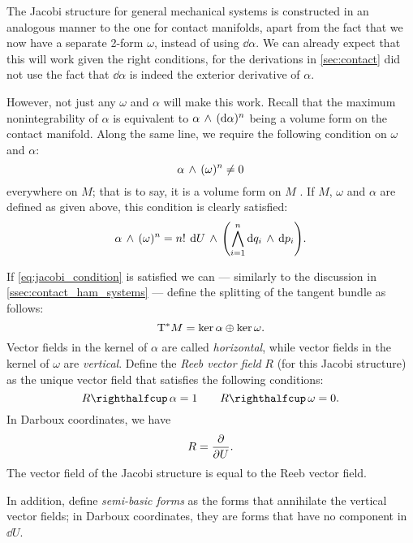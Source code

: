 The Jacobi structure for general mechanical systems is constructed in an analogous manner to the one for contact manifolds, apart from the fact that we now have a separate 2-form \(\omega\), instead of using \(\dd{\alpha}\). We can already expect that this will work given the right conditions, for the derivations in \cref{sec:contact} did not use the fact that \(\dd{\alpha}\) is indeed the exterior derivative of \(\alpha\). 

However, not just any \(\omega\) and \(\alpha\) will make this work. Recall that the maximum nonintegrability of \(\alpha\) is equivalent to \( \alpha\,\wedge\,(\dd{\alpha})^n \) being a volume form on the contact manifold. Along the same line, we require the following condition on \(\omega\) and \(\alpha\):
\begin{equation}
     \alpha\,\wedge\,(\omega)^n  \neq 0
    \label{eq:jacobi_condition}
\end{equation}
everywhere on \(M\); that is to say, it is a volume form on \(M\) \cite{ciaglia2018}. If \(M\), \(\omega\) and \(\alpha\) are defined as given above, this condition is clearly satisfied:
\begin{equation}
      \alpha\,\wedge\,(\omega)^n  = n!\: \dd{U}\,\wedge\,\qty(\bigwedge_{i=1}^{n} \dd{q_i}\,\wedge\,\dd{p_i} ) .
\end{equation}

If \cref{eq:jacobi_condition} is satisfied we can --- similarly to the discussion in \cref{ssec:contact_ham_systems} --- define the splitting of the tangent bundle as follows:
\begin{equation}
     \mathrm{T}^*M = \ker{\alpha}\oplus\ker{\omega}.
\end{equation}
Vector fields in the kernel of \(\alpha\) are called \emph{horizontal}, while vector fields in the kernel of \(\omega\) are \emph{vertical}. Define the \emph{Reeb vector field} \(R\) (for this Jacobi structure) as the unique vector field that satisfies the following conditions:
\begin{equation}
     \intpr{R}{\alpha} = 1 \qquad \intpr{R}{\omega} = 0.
\end{equation}
In Darboux coordinates, we have
\begin{equation}
     R = \pdv{}{U}.
\end{equation}
The vector field of the Jacobi structure is equal to the Reeb vector field.

In addition, define \emph{semi-basic forms} as the forms that annihilate the vertical vector fields; in Darboux coordinates, they are forms that have no component in \(\dd{U}\).

